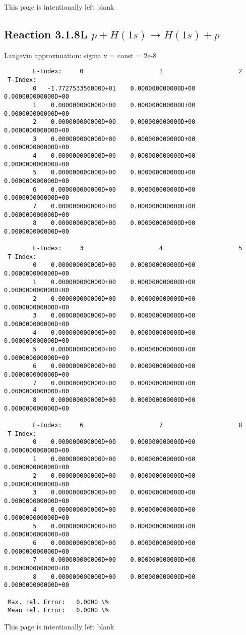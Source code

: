 \documentclass[12pt,dvipdfmx]{article}
\begin{document}
\newpage
This page is intentionally left blank
\newpage


\subsection{
Reaction 3.1.8L $ p + H(1s) \rightarrow H(1s) + p   $
}

 Langevin approximation: sigma v = const = 2e-8


\begin{small}\begin{verbatim}
        E-Index:     0                     1                     2
 T-Index:
        0   -1.772753356000D+01    0.000000000000D+00    0.000000000000D+00
        1    0.000000000000D+00    0.000000000000D+00    0.000000000000D+00
        2    0.000000000000D+00    0.000000000000D+00    0.000000000000D+00
        3    0.000000000000D+00    0.000000000000D+00    0.000000000000D+00
        4    0.000000000000D+00    0.000000000000D+00    0.000000000000D+00
        5    0.000000000000D+00    0.000000000000D+00    0.000000000000D+00
        6    0.000000000000D+00    0.000000000000D+00    0.000000000000D+00
        7    0.000000000000D+00    0.000000000000D+00    0.000000000000D+00
        8    0.000000000000D+00    0.000000000000D+00    0.000000000000D+00

        E-Index:     3                     4                     5
 T-Index:
        0    0.000000000000D+00    0.000000000000D+00    0.000000000000D+00
        1    0.000000000000D+00    0.000000000000D+00    0.000000000000D+00
        2    0.000000000000D+00    0.000000000000D+00    0.000000000000D+00
        3    0.000000000000D+00    0.000000000000D+00    0.000000000000D+00
        4    0.000000000000D+00    0.000000000000D+00    0.000000000000D+00
        5    0.000000000000D+00    0.000000000000D+00    0.000000000000D+00
        6    0.000000000000D+00    0.000000000000D+00    0.000000000000D+00
        7    0.000000000000D+00    0.000000000000D+00    0.000000000000D+00
        8    0.000000000000D+00    0.000000000000D+00    0.000000000000D+00

        E-Index:     6                     7                     8
 T-Index:
        0    0.000000000000D+00    0.000000000000D+00    0.000000000000D+00
        1    0.000000000000D+00    0.000000000000D+00    0.000000000000D+00
        2    0.000000000000D+00    0.000000000000D+00    0.000000000000D+00
        3    0.000000000000D+00    0.000000000000D+00    0.000000000000D+00
        4    0.000000000000D+00    0.000000000000D+00    0.000000000000D+00
        5    0.000000000000D+00    0.000000000000D+00    0.000000000000D+00
        6    0.000000000000D+00    0.000000000000D+00    0.000000000000D+00
        7    0.000000000000D+00    0.000000000000D+00    0.000000000000D+00
        8    0.000000000000D+00    0.000000000000D+00    0.000000000000D+00

 Max. rel. Error:   0.0000 \%
 Mean rel. Error:   0.0000 \%

\end{verbatim}\end{small}
\newpage
This page is intentionally left blank
\newpage
\end{document}
